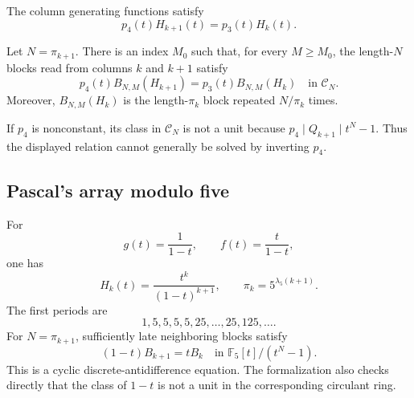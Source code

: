 The column generating functions satisfy
\begin{equation}\label{eq:f5-neighbors}
p_4(t)H_{k+1}(t)=p_3(t)H_k(t).
\end{equation}

\begin{prop}\label{prop:f5-block}
Let $N=\pi_{k+1}$. There is an index $M_0$ such that, for every
$M\geqslant M_0$, the length-$N$ blocks read from columns $k$ and $k+1$
satisfy
\[
p_4(t)B_{N,M}(H_{k+1})=p_3(t)B_{N,M}(H_k)
\quad\text{in }\mathcal C_N.
\]
Moreover, $B_{N,M}(H_k)$ is the length-$\pi_k$ block repeated
$N/\pi_k$ times.
\end{prop}

If $p_4$ is nonconstant, its class in $\mathcal C_N$ is not a unit because
$p_4\mid Q_{k+1}\mid t^N-1$. Thus the displayed relation cannot generally be
solved by inverting $p_4$.

\subsection{Pascal's array modulo five}

For
\[
g(t)=\frac{1}{1-t},
\qquad
f(t)=\frac{t}{1-t},
\]
one has
\[
H_k(t)=\frac{t^k}{(1-t)^{k+1}},
\qquad
\pi_k=5^{\lambda_5(k+1)}.
\]
The first periods are
\[
1,5,5,5,5,25,\ldots,25,125,\ldots.
\]
For $N=\pi_{k+1}$, sufficiently late neighboring blocks satisfy
\[
(1-t)B_{k+1}=tB_k
\quad\text{in }\mathbb F_5[t]/(t^N-1).
\]
This is a cyclic discrete-antidifference equation. The formalization also
checks directly that the class of $1-t$ is not a unit in the corresponding
circulant ring.
